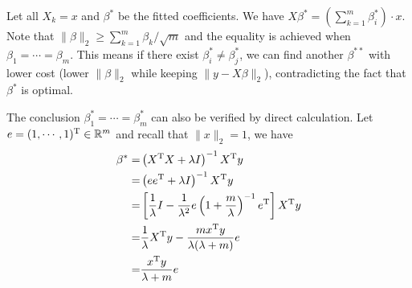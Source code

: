 \setcounter{sol}{28}
\begin{sol}
	Let all $X_k=x$ and $\beta^*$ be the fitted coefficients. We have $X\beta^*=(\sum_{k=1}^m\beta_i^*)\cdot x$. Note that $\|\beta\|_2\ge \sum_{k=1}^m\beta_k/\sqrt{m}$ and the equality is achieved when $\beta_1=\cdots=\beta_m$. This means if there exist $\beta^*_i\ne\beta^*_j$, we can find another $\beta^{**}$ with lower cost (lower $\|\beta\|_2$ while keeping $\|y-X\beta\|_2$), contradicting the fact that $\beta^*$ is optimal.
	
	The conclusion $\beta^*_1=\cdots=\beta^*_m$ can also be verified by direct calculation. Let $e=(1,\cdots,1)^{\mathrm{T}}\in\mathbb{R}^m$ and recall that $\|x\|_2=1$, we have
	\begin{align*}
	\beta^*=&\left(X^{\mathrm{T}}X+\lambda I\right)^{-1}X^{\mathrm{T}}y\\
	=& \left(ee^{\mathrm{T}}+\lambda I\right)^{-1}X^{\mathrm{T}}y\\
	=& \left[\frac{1}{\lambda}I-\frac{1}{\lambda^2}e\left(1+\frac{m}{\lambda}\right)^{-1}e^{\mathrm{T}}\right]X^{\mathrm{T}}y\\
	=& \frac{1}{\lambda}X^{\mathrm{T}}y-\frac{mx^{\mathrm{T}}y}{\lambda(\lambda+m)}e\\
	=& \frac{x^{\mathrm{T}}y}{\lambda+m}e
	\end{align*}
\end{sol}
